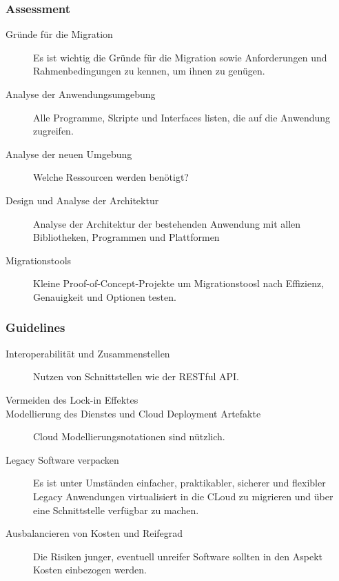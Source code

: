 \subsubsection{Assessment}
\begin{description}
	\item[Gründe für die Migration] Es ist wichtig die Gründe für die
Migration sowie Anforderungen und Rahmenbedingungen zu kennen, um ihnen zu
genügen.
	\item[Analyse der Anwendungsumgebung] Alle Programme, Skripte und
Interfaces listen, die auf die Anwendung zugreifen.
	\item[Analyse der neuen Umgebung] Welche Ressourcen werden benötigt?
	\item[Design und Analyse der Architektur] Analyse der Architektur der
bestehenden Anwendung mit allen Bibliotheken, Programmen und Plattformen
	\item[Migrationstools] Kleine Proof-of-Concept-Projekte um
Migrationstoosl nach Effizienz, Genauigkeit und Optionen testen.
\end{description}
\subsubsection{Guidelines}
\begin{description}
	\item[Interoperabilität und Zusammenstellen] Nutzen von Schnittstellen
wie der RESTful API.
	\item[Vermeiden des Lock-in Effektes]
	\item[Modellierung des Dienstes und Cloud Deployment Artefakte] Cloud
Modellierungsnotationen sind nützlich.
	\item[Legacy Software verpacken] Es ist unter Umständen einfacher,
praktikabler, sicherer und flexibler Legacy Anwendungen virtualisiert in die
CLoud zu migrieren und über eine Schnittstelle verfügbar zu machen.
	\item[Ausbalancieren von Kosten und Reifegrad] Die Risiken junger,
eventuell unreifer Software sollten in den Aspekt Kosten einbezogen werden.
\end{description}



